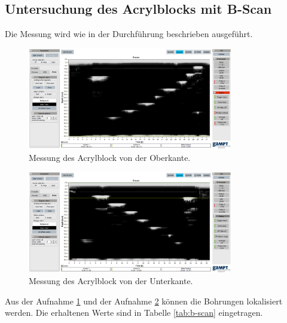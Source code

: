 \subsection{Untersuchung des Acrylblocks mit B-Scan}
Die Messung wird wie in der Durchführung beschrieben ausgeführt.
\begin{figure}[H]
  \centering
  \includegraphics[width=0.8\textwidth]{content/bscan-2mhz_oberseite.png}
  \caption{Messung des Acrylblock von der Oberkante.}
  \label{fig:obs}
\end{figure}
\begin{figure}[H]
  \centering
  \includegraphics[width=0.8\textwidth]{content/bscan-2mhz_unterseite.png}
  \caption{Messung des Acrylblock von der Unterkante.}
  \label{fig:unts}
\end{figure}
\noindent Aus der Aufnahme \ref{fig:obs} und der Aufnahme \ref{fig:unts} können die Bohrungen lokalisiert werden.
Die erhaltenen Werte sind in Tabelle \ref{tab:b-scan} eingetragen.
